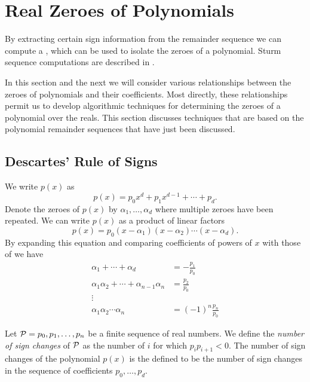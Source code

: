 \chapter{Real Zeroes of Polynomials}
\label{Sturm:Chap}

By extracting
certain sign information from the remainder sequence we can compute a
, which can be used to isolate the zeroes of a 
polynomial.  Sturm sequence computations are described in
.




In this section and the next we will consider various relationships
between the zeroes of polynomials and their coefficients.  Most
directly, these relationships permit us to develop algorithmic
techniques for determining the zeroes of a polynomial over the reals.
This section discusses techniques that are based on the polynomial
remainder sequences that have just been discussed.  

\section{Descartes' Rule of Signs}
\label{Sturm:Descartes:Sec}

We write $p(x)$ as
\begin{equation}
\label{p:Definition:Eq}
p(x) = p_{0} x^{d} + p_{1} x^{d-1} + \cdots + p_{d}.
\end{equation}
Denote the zeroes of $p(x)$ by $\alpha_1, \ldots, \alpha_d$ where
multiple zeroes have been repeated.  We can write $p(x)$ as a product
of linear factors
\[
p(x) = p_0 (x - \alpha_1) (x - \alpha_2) \cdots (x - \alpha_d).
\]
By expanding this equation and comparing coefficients of powers of $x$
with those of  we have
\begin{equation}
\label{Symmetric:Funcs:Eq}
\begin{aligned}
\alpha_1 + \cdots + \alpha_d & = - \frac{p_1}{p_0} \\
\alpha_1 \alpha_2 + \cdots + \alpha_{n-1} \alpha_n & = \frac{p_2}{p_0} \\
\vdots & \\
\alpha_1 \alpha_2 \cdots \alpha_n & = (-1)^{n} \frac{p_n}{p_0}
\end{aligned}
\end{equation}

Let ${\cal P} = p_0, p_1, \ldots, p_n$ be a finite sequence of real
numbers.  We define the {\em number of sign changes} of ${\cal P}$ as the number of $i$ for which
$p_i p_{i+1} < 0$.  The number of sign changes of the polynomial
$p(x)$ is the defined to be the number of sign changes in the sequence
of coefficients $p_0, \ldots, p_d$.

